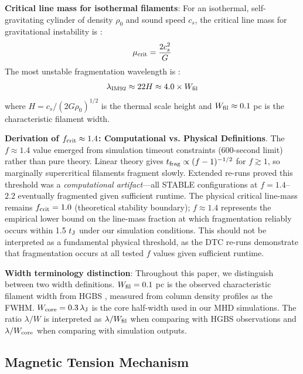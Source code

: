 \documentclass[twocolumn]{mnras}
\begin{document}
\textbf{Critical line mass for isothermal filaments}: For an isothermal, self-gravitating cylinder of density $\rho_0$ and sound speed $c_s$, the critical line mass for gravitational instability is \citep{Ostriker1964}:
\begin{equation}
\mu_{\rm crit} = \frac{2c_s^2}{G}
\end{equation}
The most unstable fragmentation wavelength is \citep{Inutsuka1992}:
\begin{equation}
\lambda_{\rm IM92} \approx 22 H \approx 4.0 \times W_{\rm fil}
\label{eq:im92}
\end{equation}
where $H = c_s/(2G\rho_0)^{1/2}$ is the thermal scale height and $W_{\rm fil} \approx 0.1$ pc is the characteristic filament width.

\textbf{Derivation of $f_{\rm crit} \approx 1.4$: Computational vs. Physical Definitions}. The $f \approx 1.4$ value emerged from simulation timeout constraints (600-second limit) rather than pure theory. Linear theory gives $t_{\rm frag} \propto (f - 1)^{-1/2}$ for $f \gtrsim 1$, so marginally supercritical filaments fragment slowly. Extended re-runs proved this threshold was a \textit{computational artifact}---all STABLE configurations at $f = 1.4$--$2.2$ eventually fragmented given sufficient runtime. The physical critical line-mass remains $f_{\rm crit} = 1.0$ (theoretical stability boundary); $f \approx 1.4$ represents the empirical lower bound on the line-mass fraction at which fragmentation reliably occurs within 1.5 $t_{\rm J}$ under our simulation conditions. This should not be interpreted as a fundamental physical threshold, as the DTC re-runs demonstrate that fragmentation occurs at all tested $f$ values given sufficient runtime.

\textbf{Width terminology distinction}: Throughout this paper, we distinguish between two width definitions. $W_{\rm fil} = 0.1$ pc is the observed characteristic filament width from HGBS \citep{Arzoumanian2011}, measured from column density profiles as the FWHM. $W_{\rm core} = 0.3\,\lambda_{\rm J}$ is the core half-width used in our MHD simulations. The ratio $\lambda/W$ is interpreted as $\lambda/W_{\rm fil}$ when comparing with HGBS observations and $\lambda/W_{\rm core}$ when comparing with simulation outputs.

\subsection{Magnetic Tension Mechanism}
\end{document}
